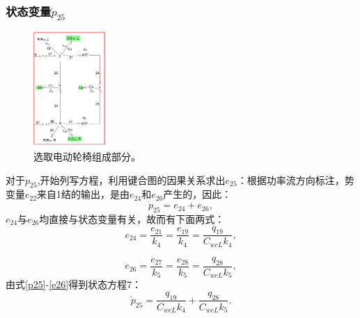 \subsubsection{状态变量$\dot{ p}_{25} $}
\begin{figure}[H]
	\centering
	\includegraphics[width=0.25\textwidth]{fig/equation6.png}
	\caption{选取电动轮椅组成部分。}\label{fig:equation6}
\end{figure}
对于$\dot{p} _ { 25 }$,开始列写方程，利用键合图的因果关系求出$e_{25}$：根据功率流方向标注，势变量$e_{22}$来自1结的输出，是由$e_{24}$和$e_{26}$产生的，因此：
\begin{equation}\label{p25}
\dot{ p } _ { 25 } = e _ { 24 } + e _ { 26 },
\end{equation}
$e_{24}$与$e_{26}$均直接与状态变量有关，故而有下面两式：
\begin{equation}
e _ { 24 } = \frac { e _ { 21 } } { k _ { 4 } } = \frac { e _ { 19 } } { k _ { 4 } } = \frac { q _ { 19 } } { C _ { w cL}  k _ { 4 } },
\end{equation}

\begin{equation}\label{e26}
e _ { 26 } = \frac { e _ { 27 } } { k _ { 5 } } = \frac { e _ { 28 } } { k _ { 5 } } = \frac { q _ { 28 } } { C _ { w c L }  k _ { 5 } },
\end{equation}
由式\ref{p25}-\ref{e26}得到状态方程7：
\begin{equation}
\dot{ p } _ { 25 } = \frac { q _ { 19 } } { C _ { w c L}  k _ { 4 } } + \frac { q _ { 28 } } { C _ { w cL }  k _ { 5 } }.
\end{equation}
